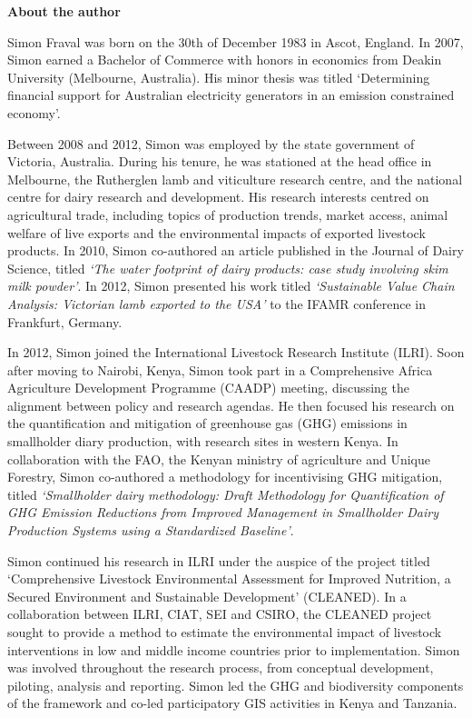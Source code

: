 {\Large\textbf{About the author}}

\small
Simon Fraval was born on the 30th of December 1983 in Ascot, England. In 2007, Simon earned a Bachelor of Commerce with honors in economics from Deakin University (Melbourne, Australia). His minor thesis was titled `Determining financial support for Australian electricity generators in an emission constrained economy'. 

Between 2008 and 2012, Simon was employed by the state government of Victoria, Australia. During his tenure, he was stationed at the head office in Melbourne, the Rutherglen lamb and viticulture research centre, and the national centre for dairy research and development. His research interests centred on agricultural trade, including topics of production trends, market access, animal welfare of live exports and the environmental impacts of exported livestock products. In 2010, Simon co-authored an article published in the Journal of Dairy Science, titled \textit{`The water footprint of dairy products: case study involving skim milk powder'}. In 2012, Simon presented his work titled \textit{`Sustainable Value Chain Analysis: Victorian lamb exported to the USA'} to the IFAMR conference in Frankfurt, Germany. 

In 2012, Simon joined the International Livestock Research Institute (ILRI). Soon after moving to Nairobi, Kenya, Simon took part in a Comprehensive Africa Agriculture Development Programme (CAADP) meeting, discussing the alignment between policy and research agendas. He then focused his research on the quantification and mitigation of greenhouse gas (GHG) emissions in smallholder diary production, with research sites in western Kenya. In collaboration with the FAO, the Kenyan ministry of agriculture and Unique Forestry, Simon co-authored a methodology for incentivising GHG mitigation, titled \textit{`Smallholder dairy methodology: Draft Methodology for Quantification of GHG Emission Reductions from Improved Management in Smallholder Dairy Production Systems using a Standardized Baseline'}. 

Simon continued his research in ILRI under the auspice of the project titled `Comprehensive Livestock Environmental Assessment for Improved Nutrition, a Secured Environment and Sustainable Development' (CLEANED). In a collaboration between ILRI, CIAT, SEI and CSIRO, the CLEANED project sought to provide a method to estimate the environmental impact of livestock interventions in low and middle income countries prior to implementation. Simon was involved throughout the research process, from conceptual development, piloting, analysis and reporting. Simon led the GHG and biodiversity components of the framework and co-led participatory GIS activities in Kenya and Tanzania.    

